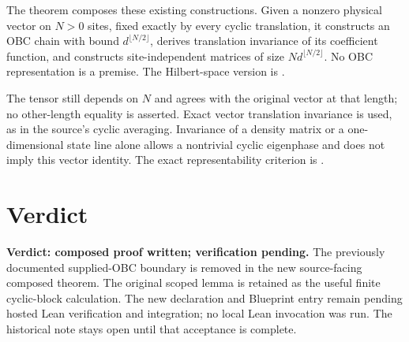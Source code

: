 \documentclass{article}
\begin{document}
The theorem 
composes these existing constructions. Given a nonzero physical vector
on $N>0$ sites, fixed exactly by every cyclic translation, it constructs
an OBC chain with bound $d^{\lfloor N/2\rfloor}$, derives translation
invariance of its coefficient function, and constructs site-independent
matrices of size $N d^{\lfloor N/2\rfloor}$. No OBC representation is a
premise. The Hilbert-space version is
.

The tensor still depends on $N$ and agrees with the original vector at
that length; no other-length equality is asserted. Exact vector
translation invariance is used, as in the source's cyclic averaging.
Invariance of a density matrix or a one-dimensional state line alone
allows a nontrivial cyclic eigenphase and does not imply this vector
identity. The exact representability criterion is
.

\section{Verdict}

\textbf{Verdict: composed proof written; verification pending.}
The previously documented supplied-OBC boundary is removed in the new
source-facing composed theorem. The original scoped lemma is retained
as the useful finite cyclic-block calculation. The new declaration and
Blueprint entry remain pending hosted Lean verification and integration;
no local Lean invocation was run. The historical note stays open until
that acceptance is complete.



\end{document}
